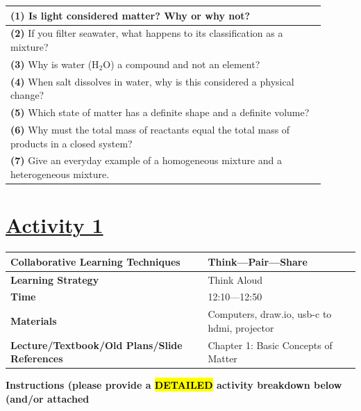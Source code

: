 \documentclass{article}
\begin{document}
\begin{tabular}{|p{0.9\linewidth}|}
\hline
\textbf{(1)} Is light considered matter? Why or why not? \\ 
\hline
\textbf{(2)} If you filter seawater, what happens to its classification as a mixture? \\ 
\hline
\textbf{(3)} Why is water (H$_2$O) a compound and not an element? \\ 
\hline
\textbf{(4)} When salt dissolves in water, why is this considered a physical change? \\
\hline
\textbf{(5)} Which state of matter has a definite shape and a definite volume? \\
\hline
\textbf{(6)} Why must the total mass of reactants equal the total mass of products in a closed system? \\
\hline
\textbf{(7)} Give an everyday example of a homogeneous mixture and a heterogeneous mixture. \\
\hline
\end{tabular}
\newpage
\noindent
\section*{\underline{Activity 1}}
\begin{tabular}{|p{4.2cm}|p{9.8cm}|}
\hline
\textbf{Collaborative Learning Techniques} & Think---Pair---Share \\
\hline
\textbf{Learning Strategy} & Think Aloud \\
\hline
\textbf{Time} & 12:10---12:50 \\
\hline
\textbf{Materials} & Computers, draw.io, usb-c to hdmi, projector \\
\hline
\textbf{Lecture/Textbook/Old Plans/Slide References} & Chapter 1: Basic Concepts of Matter \\
\hline
\end{tabular}

\vspace{0.5cm}

\noindent
{\large \textbf{Instructions (please provide a \hl{DETAILED} activity breakdown below (and/or attached}} \\
\end{document}
